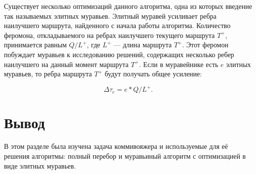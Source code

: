 Существует несколько оптимизаций данного алгоритма, одна из которых введение так называемых элитных муравьев. Элитный муравей усиливает ребра наилучшего маршрута, найденного с начала работы алгоритма. Количество феромона, откладываемого на ребрах наилучшего текущего
маршрута $T^+$, принимается равным $Q/L^+$, где $L^+$ — длина маршрута $T^+$. Этот феромон побуждает муравьев к исследованию решений, содержащих несколько ребер наилучшего на данный момент маршрута $T^+$. Если в муравейнике есть $e$ элитных муравьев, то ребра маршрута $T^+$ будут получать общее усиление:

\begin{equation}
	\label{opt}
	\Delta \tau_{e} = e * Q/L^+.
\end{equation}

\section*{\hsp Вывод}

В этом разделе была изучена задача коммивояжера и используемые для её решения алгоритмы: полный перебор и муравьиный алгоритм с оптимизацией в виде элитных муравьев.
